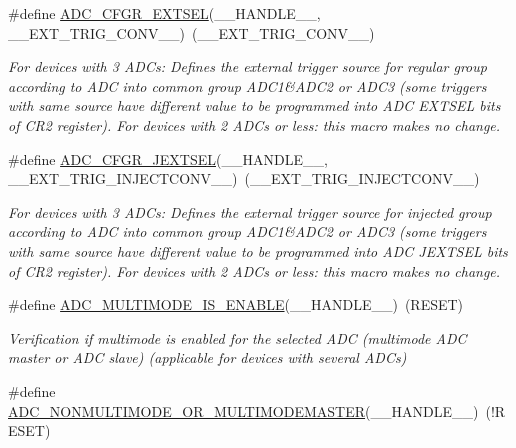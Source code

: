 \begin{DoxyCompactItemize}
\item 
\#define \hyperlink{group___a_d_c_ex___private___macro_ga08652deb6ad9a73620490807ac8c6053}{A\+D\+C\+\_\+\+C\+F\+G\+R\+\_\+\+E\+X\+T\+S\+EL}(\+\_\+\+\_\+\+H\+A\+N\+D\+L\+E\+\_\+\+\_\+,  \+\_\+\+\_\+\+E\+X\+T\+\_\+\+T\+R\+I\+G\+\_\+\+C\+O\+N\+V\+\_\+\+\_\+)~(\+\_\+\+\_\+\+E\+X\+T\+\_\+\+T\+R\+I\+G\+\_\+\+C\+O\+N\+V\+\_\+\+\_\+)
\begin{DoxyCompactList}\small\item\em For devices with 3 A\+D\+Cs\+: Defines the external trigger source for regular group according to A\+DC into common group A\+D\+C1\&A\+D\+C2 or A\+D\+C3 (some triggers with same source have different value to be programmed into A\+DC E\+X\+T\+S\+EL bits of C\+R2 register). For devices with 2 A\+D\+Cs or less\+: this macro makes no change. \end{DoxyCompactList}\item 
\#define \hyperlink{group___a_d_c_ex___private___macro_gafe312b4271f46a1a24243e3021dc9e2a}{A\+D\+C\+\_\+\+C\+F\+G\+R\+\_\+\+J\+E\+X\+T\+S\+EL}(\+\_\+\+\_\+\+H\+A\+N\+D\+L\+E\+\_\+\+\_\+,  \+\_\+\+\_\+\+E\+X\+T\+\_\+\+T\+R\+I\+G\+\_\+\+I\+N\+J\+E\+C\+T\+C\+O\+N\+V\+\_\+\+\_\+)~(\+\_\+\+\_\+\+E\+X\+T\+\_\+\+T\+R\+I\+G\+\_\+\+I\+N\+J\+E\+C\+T\+C\+O\+N\+V\+\_\+\+\_\+)
\begin{DoxyCompactList}\small\item\em For devices with 3 A\+D\+Cs\+: Defines the external trigger source for injected group according to A\+DC into common group A\+D\+C1\&A\+D\+C2 or A\+D\+C3 (some triggers with same source have different value to be programmed into A\+DC J\+E\+X\+T\+S\+EL bits of C\+R2 register). For devices with 2 A\+D\+Cs or less\+: this macro makes no change. \end{DoxyCompactList}\item 
\#define \hyperlink{group___a_d_c_ex___private___macro_ga44487b8068ac9f116ab789148f8d48c3}{A\+D\+C\+\_\+\+M\+U\+L\+T\+I\+M\+O\+D\+E\+\_\+\+I\+S\+\_\+\+E\+N\+A\+B\+LE}(\+\_\+\+\_\+\+H\+A\+N\+D\+L\+E\+\_\+\+\_\+)~(R\+E\+S\+ET)
\begin{DoxyCompactList}\small\item\em Verification if multimode is enabled for the selected A\+DC (multimode A\+DC master or A\+DC slave) (applicable for devices with several A\+D\+Cs) \end{DoxyCompactList}\item 
\#define \hyperlink{group___a_d_c_ex___private___macro_ga0b97545981bf2d7f767a98fd018c78af}{A\+D\+C\+\_\+\+N\+O\+N\+M\+U\+L\+T\+I\+M\+O\+D\+E\+\_\+\+O\+R\+\_\+\+M\+U\+L\+T\+I\+M\+O\+D\+E\+M\+A\+S\+T\+ER}(\+\_\+\+\_\+\+H\+A\+N\+D\+L\+E\+\_\+\+\_\+)~(!R\+E\+S\+ET)

\end{DoxyCompactItemize}
